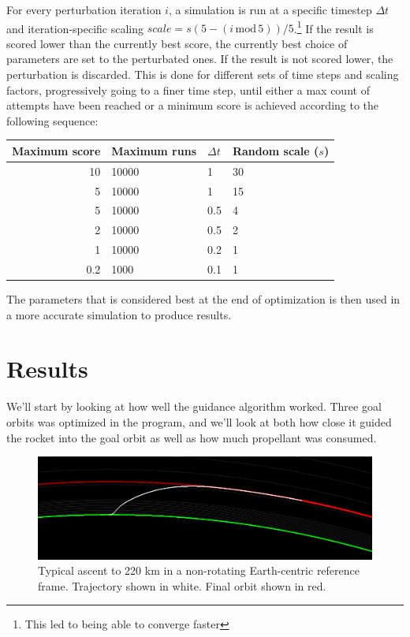 \documentclass[11pt]{article}
\begin{document}
For every perturbation iteration $i$, a simulation is run at a specific timestep $\Delta t$ and iteration-specific scaling 
$ scale = s (5 - (i\,\text{mod}\,5)) / 5$.\footnote{This led to being able to converge faster} If the result is scored lower than the currently best score, the currently best choice of parameters are set to
the perturbated ones.
If the result is not scored lower, the perturbation is discarded.
This is done for different sets of time steps and scaling factors, progressively going to a finer time step, until either a max count of attempts have been reached or a minimum score is achieved according to the following sequence:
\begin{center}
  \begin{tabular}{ r | l | l | l  }
    Maximum score & Maximum runs & $\Delta t$ & Random scale ($s$) \\
    \hline
    10 & 10000 & 1 & 30 \\
    5 & 10000 & 1 & 15 \\
    5 & 10000 & 0.5 & 4 \\
    2 & 10000 & 0.5 & 2 \\
    1 & 10000 & 0.2 & 1 \\
    0.2 & 1000 & 0.1 & 1 \\
  \end{tabular}
\end{center}

The parameters that is considered best at the end of optimization is then used in a more accurate simulation to produce results.

\section{Results}
We'll start by looking at how well the guidance algorithm worked. Three goal orbits was optimized in the program, and we'll look at both how close it guided the rocket into the goal orbit as well as how much propellant was consumed.

\begin{figure}[H]
  \centering
  \includegraphics[width=\textwidth]{./220km.png}
  \caption{
    \label{fig:trajectory}
    Typical ascent to 220 km in a non-rotating Earth-centric reference frame. Trajectory shown in white. Final orbit shown in red.}
\end{figure}
\end{document}

